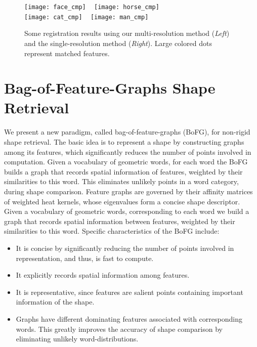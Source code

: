 \begin{figure}\centering
  \texttt{[image: face\_cmp]}
  ~
  \texttt{[image: horse\_cmp]}
  \\
  \texttt{[image: cat\_cmp]}
  ~
  \texttt{[image: man\_cmp]}
\caption[Registration results using multi-resolution method.]
 {Some registration results using our multi-resolution method (\emph{Left}) and the single-resolution method \cite{Hou:2011:TVCG} (\emph{Right}). Large colored dots represent matched features.}
\label{fig:results}
\end{figure}

\section{Bag-of-Feature-Graphs Shape Retrieval}

We present a new paradigm, called bag-of-feature-graphs (BoFG), for non-rigid shape retrieval. The basic idea is to represent a shape by constructing graphs among its features, which significantly reduces the number of points involved in computation. Given a vocabulary of geometric words, for each word the BoFG builds a graph that records spatial information of features, weighted by their similarities to this word. This eliminates unlikely points in a word category, during shape comparison. Feature graphs are governed by their affinity matrices of weighted heat kernels, whose eigenvalues form a concise shape descriptor. Given a vocabulary of geometric words, corresponding to each word we build a graph that records spatial information between features, weighted by their similarities to this word. Specific characteristics of the BoFG include:
\begin{itemize}
\item It is concise by significantly reducing the number of points involved in representation, and thus, is fast to compute.
\item It explicitly records spatial information among features.
\item It is representative, since features are salient points
containing important information of the shape.
\item Graphs have different dominating features associated with corresponding words. This greatly improves the accuracy of shape comparison by eliminating unlikely word-distributions.
\end{itemize}

